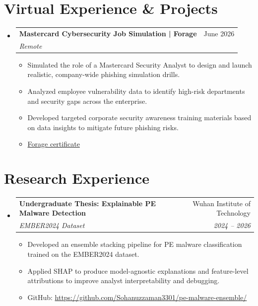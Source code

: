 \documentclass[letterpaper,11pt]{article}
\makeatletter
\newcommand{\resumeItem}[1]{
  \item\small{
    {#1 \vspace{-2pt}}
  }
}
\newcommand{\resumeSubheading}[4]{
  \vspace{-2pt}\item
    \begin{tabular*}{0.97\textwidth}[t]{l@{\extracolsep{\fill}}r}
      \textbf{#1} & #2 \\
      \textit{\small#3} & \textit{\small #4} \\
    \end{tabular*}\vspace{-7pt}
}
\newcommand{\resumeSubHeadingListStart}{\begin{itemize}[leftmargin=0.15in, label={}]}
\newcommand{\resumeSubHeadingListEnd}{\end{itemize}}
\newcommand{\resumeItemListStart}{\begin{itemize}}
\newcommand{\resumeItemListEnd}{\end{itemize}\vspace{-5pt}}
\makeatother
\begin{document}
\section{Virtual Experience \& Projects}
\resumeSubHeadingListStart
\resumeSubheading
{Mastercard Cybersecurity Job Simulation | Forage}{June 2026}
{Remote}{}
\resumeItemListStart
\resumeItem{Simulated the role of a Mastercard Security Analyst to design and launch realistic, company-wide phishing simulation drills.}
\resumeItem{Analyzed employee vulnerability data to identify high-risk departments and security gaps across the enterprise.}
\resumeItem{Developed targeted corporate security awareness training materials based on data insights to mitigate future phishing risks.}
\resumeItem{\small\href{https://tinyurl.com/mastercardExp}{Forage certificate}}
\resumeItemListEnd
\resumeSubHeadingListEnd
%
\section{Research Experience}
    \resumeSubHeadingListStart
      \resumeSubheading
          {Undergraduate Thesis: Explainable PE Malware Detection}{Wuhan Institute of Technology}
          {EMBER2024 Dataset}{2024 -- 2026}
          \resumeItemListStart
            \resumeItem{Developed an ensemble stacking pipeline for PE malware classification trained on the EMBER2024 dataset.}
            \resumeItem{Applied SHAP to produce model-agnostic explanations and feature-level attributions to improve analyst interpretability and debugging.}
          \resumeItemListEnd
      \begin{itemize}[leftmargin=0.15in, label={}]
      \item \small GitHub: \href{https://github.com/Sohanuzzaman3301/pe-malware-ensemble/}{https://github.com/Sohanuzzaman3301/pe-malware-ensemble/}
      \end{itemize}
    \resumeSubHeadingListEnd


\end{document}
